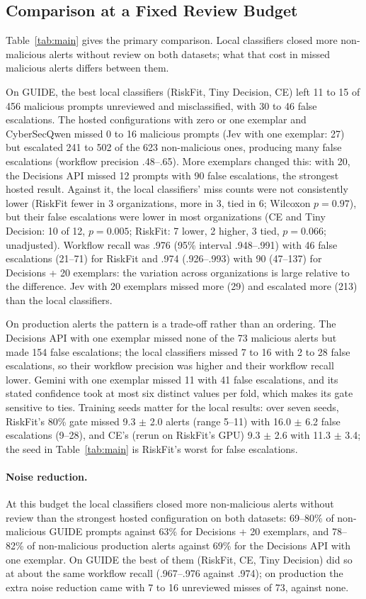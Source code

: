 \documentclass[letterpaper]{article} %
\begin{document}
\subsection{Comparison at a Fixed Review Budget}

Table~\ref{tab:main} gives the primary comparison. Local classifiers closed more non-malicious alerts without review on both datasets; what that cost in missed malicious alerts differs between them.

On GUIDE, the best local classifiers (RiskFit, Tiny Decision, CE) left 11 to 15 of 456 malicious prompts unreviewed and misclassified, with 30 to 46 false escalations. The hosted configurations with zero or one exemplar and CyberSecQwen missed 0 to 16 malicious prompts (Jev with one exemplar: 27) but escalated 241 to 502 of the 623 non-malicious ones, producing many false escalations (workflow precision .48--.65). More exemplars changed this: with 20, the Decisions API missed 12 prompts with 90 false escalations, the strongest hosted result. Against it, the local classifiers' miss counts were not consistently lower (RiskFit fewer in 3 organizations, more in 3, tied in 6; Wilcoxon $p{=}0.97$), but their false escalations were lower in most organizations (CE and Tiny Decision: 10 of 12, $p{=}0.005$; RiskFit: 7 lower, 2 higher, 3 tied, $p{=}0.066$; unadjusted). Workflow recall was .976 (95\% interval .948--.991) with 46 false escalations (21--71) for RiskFit and .974 (.926--.993) with 90 (47--137) for Decisions + 20 exemplars: the variation across organizations is large relative to the difference. Jev with 20 exemplars missed more (29) and escalated more (213) than the local classifiers.

On production alerts the pattern is a trade-off rather than an ordering. The Decisions API with one exemplar missed none of the 73 malicious alerts but made 154 false escalations; the local classifiers missed 7 to 16 with 2 to 28 false escalations, so their workflow precision was higher and their workflow recall lower. Gemini with one exemplar missed 11 with 41 false escalations, and its stated confidence took at most six distinct values per fold, which makes its gate sensitive to ties. Training seeds matter for the local results: over seven seeds, RiskFit's 80\% gate missed 9.3 $\pm$ 2.0 alerts (range 5--11) with 16.0 $\pm$ 6.2 false escalations (9--28), and CE's (rerun on RiskFit's GPU) 9.3 $\pm$ 2.6 with 11.3 $\pm$ 3.4; the seed in Table~\ref{tab:main} is RiskFit's worst for false escalations.

\paragraph{Noise reduction.} At this budget the local classifiers closed more non-malicious alerts without review than the strongest hosted configuration on both datasets: 69--80\% of non-malicious GUIDE prompts against 63\% for Decisions + 20 exemplars, and 78--82\% of non-malicious production alerts against 69\% for the Decisions API with one exemplar. On GUIDE the best of them (RiskFit, CE, Tiny Decision) did so at about the same workflow recall (.967--.976 against .974); on production the extra noise reduction came with 7 to 16 unreviewed misses of 73, against none.
\end{document}
